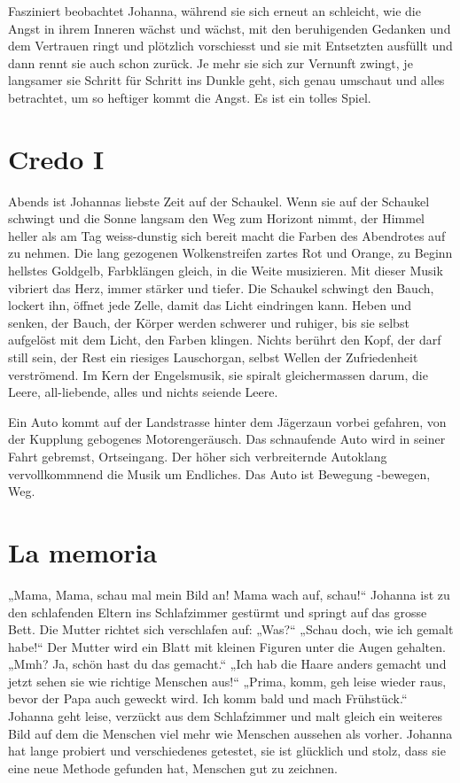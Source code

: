\documentclass[10pt,titlepage,a5paper]{book}
\begin{document}
Fasziniert beobachtet Johanna, während sie sich erneut an schleicht, wie die Angst in ihrem Inneren wächst und wächst, mit den beruhigenden Gedanken und dem Vertrauen ringt und plötzlich vorschiesst und sie mit Entsetzten ausfüllt und dann rennt sie auch schon zurück. Je mehr sie sich zur Vernunft zwingt, je langsamer sie Schritt für Schritt ins Dunkle geht, sich genau umschaut und alles betrachtet, um so heftiger kommt die Angst.
Es ist ein tolles Spiel.



\section*{Credo I}



Abends ist Johannas liebste Zeit auf der Schaukel. Wenn sie auf der Schaukel schwingt und die  Sonne langsam den Weg zum Horizont nimmt, der Himmel heller als am Tag weiss-dunstig sich bereit macht die Farben des Abendrotes auf zu nehmen. Die lang gezogenen Wolkenstreifen zartes Rot und Orange, zu Beginn hellstes Goldgelb, Farbklängen gleich, in die Weite musizieren. Mit dieser Musik vibriert das Herz, immer stärker und tiefer. Die Schaukel schwingt den Bauch, lockert ihn, öffnet jede Zelle, damit das Licht eindringen kann. Heben und senken, der Bauch, der Körper werden schwerer und ruhiger, bis sie selbst aufgelöst mit dem Licht, den Farben klingen. 
Nichts berührt den Kopf, der darf still sein, der Rest ein riesiges Lauschorgan, selbst Wellen der Zufriedenheit verströmend. Im Kern der Engelsmusik, sie spiralt gleichermassen darum, die Leere, all-liebende, alles und nichts seiende Leere.

Ein Auto kommt auf der Landstrasse hinter dem Jägerzaun vorbei gefahren, von der Kupplung gebogenes Motorengeräusch. Das schnaufende Auto wird in seiner Fahrt gebremst, Ortseingang. Der höher sich verbreiternde Autoklang vervollkommnend die Musik um Endliches. Das Auto ist Bewegung -bewegen, Weg.
 


\section*{La memoria}



„Mama, Mama, schau mal mein Bild an! Mama wach auf, schau!“ Johanna ist zu den schlafenden Eltern ins Schlafzimmer gestürmt und springt auf das grosse Bett. Die Mutter richtet sich verschlafen auf: „Was?“ „Schau doch, wie ich gemalt habe!“ Der Mutter wird ein Blatt mit kleinen Figuren unter die Augen gehalten. „Mmh? Ja, schön hast du das gemacht.“ „Ich hab die Haare anders gemacht und jetzt sehen sie wie richtige Menschen aus!“ „Prima, komm, geh leise wieder raus, bevor der Papa auch geweckt wird. Ich komm bald und mach Frühstück.“ Johanna geht leise, verzückt aus dem Schlafzimmer und malt gleich ein weiteres Bild auf dem die Menschen viel mehr wie Menschen aussehen als vorher. Johanna hat lange probiert und verschiedenes getestet, sie ist glücklich und stolz, dass sie eine neue Methode gefunden hat, Menschen gut zu zeichnen.
\end{document}

